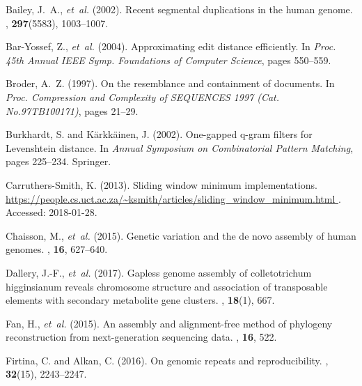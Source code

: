 \documentclass{article}
\begin{document}
\begin{thebibliography}{}
Bailey, J.~A., {\em et~al.} (2002).
\newblock Recent segmental duplications in the human genome.
, {\bf 297}(5583), 1003--1007.

Bar-Yossef, Z., {\em et~al.} (2004).
\newblock Approximating edit distance efficiently.
\newblock In {\em Proc. 45th Annual IEEE Symp. Foundations of Computer
  Science\/}, pages 550--559.

Broder, A.~Z. (1997).
\newblock On the resemblance and containment of documents.
\newblock In {\em Proc. Compression and Complexity of SEQUENCES 1997 (Cat.
  No.97TB100171)\/}, pages 21--29.

Burkhardt, S. and K{\"a}rkk{\"a}inen, J. (2002).
\newblock One-gapped q-gram filters for {Levenshtein} distance.
\newblock In {\em Annual Symposium on Combinatorial Pattern Matching\/}, pages
  225--234. Springer.

Carruthers-Smith, K. (2013).
\newblock Sliding window minimum implementations.
\newblock
  \url{https://people.cs.uct.ac.za/~ksmith/articles/sliding_window_minimum.html
  }.
\newblock Accessed: 2018-01-28.

Chaisson, M., {\em et~al.} (2015).
\newblock Genetic variation and the de novo assembly of human genomes.
, {\bf 16}, 627--640.

Dallery, J.-F., {\em et~al.} (2017).
\newblock Gapless genome assembly of colletotrichum higginsianum reveals
  chromosome structure and association of transposable elements with secondary
  metabolite gene clusters.
, {\bf 18}(1), 667.

Fan, H., {\em et~al.} (2015).
\newblock An assembly and alignment-free method of phylogeny reconstruction
  from next-generation sequencing data.
, {\bf 16}, 522.

Firtina, C. and Alkan, C. (2016).
\newblock On genomic repeats and reproducibility.
, {\bf 32}(15), 2243--2247.


\end{thebibliography}
\end{document}
